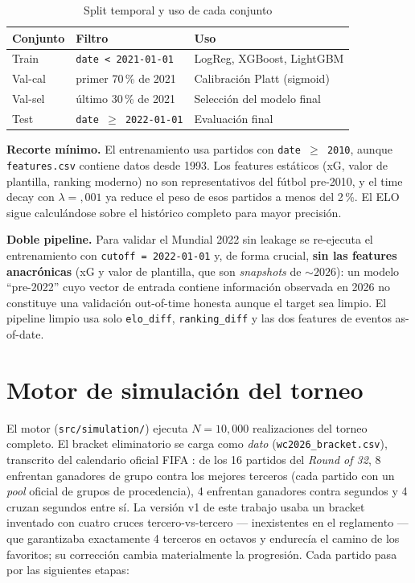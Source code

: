 \documentclass[conference]{IEEEtran}
\begin{document}
\begin{table}[!t]
  \caption{Split temporal y uso de cada conjunto}
  \label{tab:split}
  \centering
  \renewcommand{\arraystretch}{1.15}
  \footnotesize
  \begin{tabular}{@{}L{1.7cm}L{2.6cm}L{3.1cm}@{}}
    \toprule
    \textbf{Conjunto} & \textbf{Filtro}                               & \textbf{Uso}                  \\
    \midrule
    Train             & \texttt{date < 2021-01-01}                    & LogReg, XGBoost, LightGBM     \\
    Val-cal           & primer 70\,\% de 2021                         & Calibraci\'on Platt (sigmoid) \\
    Val-sel           & \'ultimo 30\,\% de 2021                       & Selecci\'on del modelo final  \\
    Test              & \texttt{date $\ge$ 2022-01-01}                & Evaluaci\'on final            \\
    \bottomrule
  \end{tabular}
\end{table}

\textbf{Recorte m\'inimo.} El entrenamiento usa partidos con
\texttt{date $\geq$ 2010}, aunque \texttt{features.csv} contiene datos
desde 1993. Los features est\'aticos (xG, valor de plantilla, ranking
moderno) no son representativos del f\'utbol pre-2010, y el time decay
con $\lambda\!=\!{,}001$ ya reduce el peso de esos partidos a menos del
2\,\%. El ELO sigue calcul\'andose sobre el hist\'orico completo para
mayor precisi\'on.

\textbf{Doble pipeline.} Para validar el Mundial 2022 sin leakage se
re-ejecuta el entrenamiento con \texttt{cutoff = 2022-01-01} y, de forma
crucial, \textbf{sin las features anacr\'onicas} (xG y valor de
plantilla, que son \emph{snapshots} de ${\sim}2026$): un modelo
``pre-2022'' cuyo vector de entrada contiene informaci\'on observada en
2026 no constituye una validaci\'on out-of-time honesta aunque el target
sea limpio. El pipeline limpio usa solo \texttt{elo\_diff},
\texttt{ranking\_diff} y las dos features de eventos as-of-date.

\section{Motor de simulaci\'on del torneo}
\label{sec:simulation}

El motor (\texttt{src/simulation/}) ejecuta $N{=}10{,}000$ realizaciones
del torneo completo. El bracket eliminatorio se carga como \emph{dato}
(\texttt{wc2026\_bracket.csv}), transcrito del calendario oficial FIFA
\cite{fifa2026,wiki_knockout}: de los 16 partidos del \emph{Round of 32},
8 enfrentan ganadores de grupo contra los mejores terceros (cada partido
con un \emph{pool} oficial de grupos de procedencia), 4 enfrentan
ganadores contra segundos y 4 cruzan segundos entre s\'i. La versi\'on v1
de este trabajo usaba un bracket inventado con cuatro cruces
tercero-vs-tercero --- inexistentes en el reglamento --- que garantizaba
exactamente 4 terceros en octavos y endurec\'ia el camino de los
favoritos; su correcci\'on cambia materialmente la progresi\'on. Cada
partido pasa por las siguientes etapas:
\end{document}
